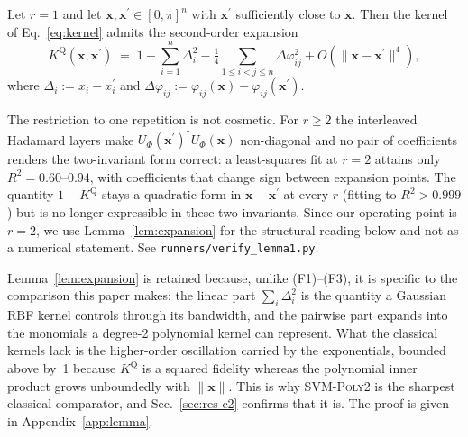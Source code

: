 \begin{revbody}
\begin{lemma}[Local expansion of the \ZZ{} kernel at $r=1$]
\label{lem:expansion}
Let $r=1$ and let $\bm{x},\bm{x}^{\prime}\in[0,\pi]^n$ with $\bm{x}^{\prime}$
sufficiently close to $\bm{x}$. Then the kernel of Eq.~\eqref{eq:kernel} admits
the second-order expansion
\begin{equation}
\label{eq:expansion}
  K^{\mathrm{Q}}(\bm{x},\bm{x}^{\prime}) \;=\; 1
  - \sum_{i=1}^{n}\Delta_i^2
  - \tfrac{1}{4}\!\!\sum_{1\le i<j\le n}\!\!\Delta\varphi_{ij}^2
  + O(\|\bm{x}-\bm{x}^{\prime}\|^4),
\end{equation}
where $\Delta_i := x_i - x_i^{\prime}$ and
$\Delta\varphi_{ij} := \varphi_{ij}(\bm{x}) - \varphi_{ij}(\bm{x}^{\prime})$.
\end{lemma}

\begin{remark}
\label{rem:reps}
The restriction to one repetition is not cosmetic. For $r\ge2$ the interleaved
Hadamard layers make $U_{\Phi}(\bm{x}^{\prime})^{\dagger}U_{\Phi}(\bm{x})$
non-diagonal and no pair of coefficients renders the two-invariant form correct:
a least-squares fit at $r=2$ attains only $R^2=0.60$--$0.94$, with coefficients
that change sign between expansion points. The quantity $1-K^{\mathrm{Q}}$
stays a quadratic form in $\bm{x}-\bm{x}^{\prime}$ at every $r$ (fitting to
$R^2>0.999$) but is no longer expressible in these two invariants. Since our
operating point is $r=2$, we use Lemma~\ref{lem:expansion} for the structural
reading below and not as a numerical statement. See
\texttt{runners/verify\_lemma1.py}.
\end{remark}

Lemma~\ref{lem:expansion} is retained because, unlike (F1)--(F3), it is specific
to the comparison this paper makes: the linear part $\sum_i \Delta_i^2$ is the
quantity a Gaussian RBF kernel controls through its bandwidth, and the pairwise
part expands into the monomials a degree-2 polynomial kernel can represent. What
the classical kernels lack is the higher-order oscillation carried by the
exponentials, bounded above by~1 because $K^{\mathrm{Q}}$ is a squared fidelity
whereas the polynomial inner product grows unboundedly with $\|\bm{x}\|$. This is
why SVM-\textsc{Poly2} is the sharpest classical comparator, and
Sec.~\ref{sec:res-c2} confirms that it is. The proof is given in
Appendix~\ref{app:lemma}.
\end{revbody}

